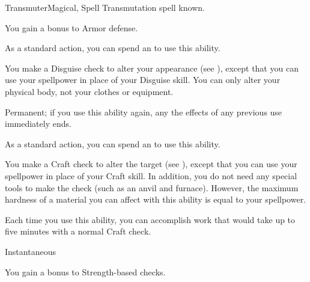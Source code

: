    \begin{feat}{Transmuter}{Magical, Spell}
        \featpre Transmutation spell known.
        \featben

         You gain a  bonus to Armor defense.

         As a standard action, you can spend an  to use this ability.
        \begin{ability}
            \begin{spelleffects}
                \spelleffect You make a Disguise check to alter your appearance (see ), except that you can use your spellpower in place of your Disguise skill.
                You can only alter your physical body, not your clothes or equipment.
            \end{spelleffects}
            \spelldur Permanent; if you use this ability again, any the effects of any previous use immediately ends.
        \end{ability}

         As a standard action, you can spend an  to use this ability.
        \begin{ability}
            \begin{spelltargetinginfo}
            \end{spelltargetinginfo}
            \begin{spelleffects}
                \spelleffect You make a Craft check to alter the target (see ), except that you can use your spellpower in place of your Craft skill.
                In addition, you do not need any special tools to make the check (such as an anvil and furnace).
                However, the maximum hardness of a material you can affect with this ability is equal to your spellpower.

                Each time you use this ability, you can accomplish work that would take up to five minutes with a normal Craft check.
            \end{spelleffects}
            \spelldur Instantaneous
        \end{ability}

         You gain a  bonus to Strength-based checks.


\end{feat}

